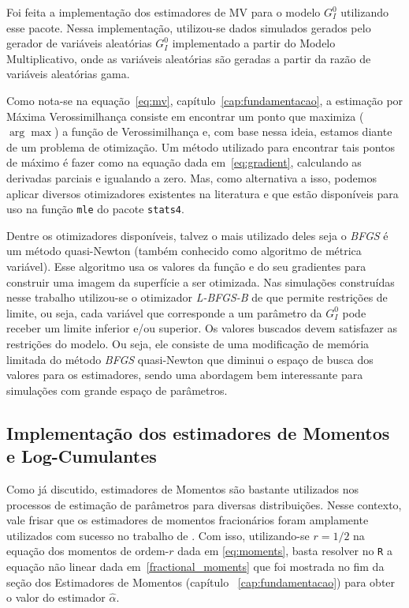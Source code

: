 Foi feita a implementação dos estimadores de MV para o modelo $G_I^0$ utilizando esse pacote. Nessa implementação, utilizou-se dados simulados gerados pelo gerador de variáveis aleatórias $G_I^0$ implementado a partir do Modelo Multiplicativo, onde as variáveis aleatórias são geradas a partir da razão de variáveis aleatórias gama.

Como nota-se na equação~\eqref{eq:mv}, capítulo~\ref{cap:fundamentacao}, a estimação por Máxima Verossimilhança consiste em encontrar um ponto que maximiza ($\arg\max$) a função de Verossimilhança e, com base nessa ideia, estamos diante de um problema de otimização. 
Um método utilizado para encontrar tais pontos de máximo é fazer como na equação dada em~\eqref{eq:gradient}, calculando as derivadas parciais e igualando a zero. 
Mas, como alternativa a isso, podemos aplicar diversos otimizadores existentes na literatura e que estão disponíveis para uso na função \texttt{mle} do pacote \texttt{stats4}.

Dentre os otimizadores disponíveis, talvez o mais utilizado deles seja o \emph{BFGS} é um método quasi-Newton (também conhecido como algoritmo de métrica variável).  
Esse algoritmo usa os valores da função e do seu gradientes para construir uma imagem da superfície a ser otimizada. 
Nas simulações construídas nesse trabalho utilizou-se o otimizador \emph{L-BFGS-B} de \citet{Byrd_1995} que permite restrições de limite, ou seja, cada variável que corresponde a um parâmetro da $G_I^0$ pode receber um limite inferior e/ou superior. 
Os valores buscados devem satisfazer as restrições do modelo. 
Ou seja, ele consiste de uma modificação de memória limitada do método \emph{BFGS} quasi-Newton que diminui o espaço de busca dos valores para os estimadores, sendo uma abordagem bem interessante para simulações com grande espaço de parâmetros.

\subsection{Implementação dos estimadores de Momentos e Log-Cumulantes}

Como já discutido, estimadores de Momentos são bastante utilizados nos processos de estimação de parâmetros para diversas distribuições. Nesse contexto, vale frisar que os estimadores de momentos fracionários foram amplamente utilizados com sucesso no trabalho de \citet{Clutter1997}. 
Com isso, utilizando-se $r = 1/2$ na equação dos momentos de ordem-$r$ dada em \eqref{eq:moments}, basta resolver no \texttt{R} a equação não linear dada em~\eqref{fractional_moments} que foi mostrada no fim da seção dos Estimadores de Momentos (capítulo ~\ref{cap:fundamentacao}) para obter o valor do estimador $\widehat{\alpha}$.

